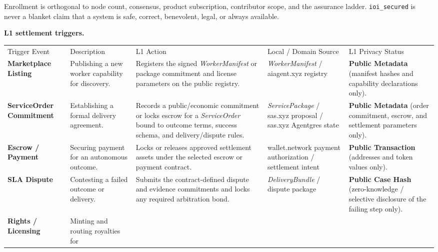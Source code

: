 \documentclass[
  11pt,
]{article}
\begin{document}
Enrollment is orthogonal to node count, consensus, product subscription,
contributor scope, and the assurance ladder. \texttt{ioi\_secured} is never a
blanket claim that a system is safe, correct, benevolent, legal, or always
available.

\textbf{L1 settlement triggers.}

\begin{longtable}[]{@{}
  >{\raggedright\arraybackslash}p{}
  >{\raggedright\arraybackslash}p{}
  >{\raggedright\arraybackslash}p{}
  >{\raggedright\arraybackslash}p{}
  >{\raggedright\arraybackslash}p{}@{}}
\toprule\noalign{}
& & & & \\
\midrule\noalign{}
\endhead
\bottomrule\noalign{}
\endlastfoot
Trigger Event & Description & L1 Action & Local / Domain Source & L1
Privacy Status \\
\textbf{Marketplace Listing} & Publishing a new worker capability for
discovery. & Registers the signed \emph{WorkerManifest} or package commitment
and license parameters on the public registry. & \emph{WorkerManifest} / aiagent.xyz
registry & \textbf{Public Metadata} (manifest hashes and capability
declarations only). \\
\textbf{ServiceOrder Commitment} & Establishing a formal delivery
agreement. & Records a public/economic commitment or locks escrow for a
\emph{ServiceOrder} bound to outcome terms, success schema, and
delivery/dispute rules. & \emph{ServicePackage} / sas.xyz proposal /
sas.xyz Agentgres state & \textbf{Public Metadata} (order commitment,
escrow, and settlement parameters only). \\
\textbf{Escrow / Payment} & Securing payment for an autonomous outcome.
& Locks or releases approved settlement assets under the selected escrow or
payment contract. & wallet.network payment authorization / settlement intent &
\textbf{Public Transaction} (addresses and token values only). \\
\textbf{SLA Dispute} & Contesting a failed outcome or delivery. &
Submits the contract-defined dispute and evidence commitments and locks any
required arbitration bond. & \emph{DeliveryBundle} / dispute package &
\textbf{Public Case Hash} (zero-knowledge / selective disclosure of the
failing step only). \\
\textbf{Rights / Licensing} & Minting and routing royalties for

\end{longtable}
\end{document}
